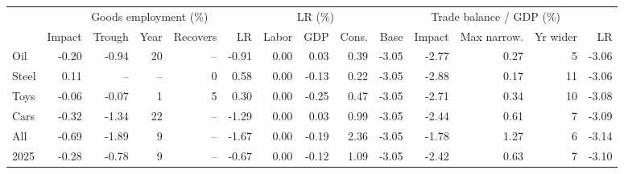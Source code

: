 \begin{tabular}{lrrrrrrrrrrrrr}
\toprule
 & \multicolumn{5}{c}{Goods employment (\%)} & \multicolumn{3}{c}{LR (\%)} & \multicolumn{5}{c}{Trade balance / GDP (\%)} \\
\cmidrule(lr){2-6}\cmidrule(lr){7-9}\cmidrule(lr){10-14}
 & Impact & Trough & Year & Recovers & LR & Labor & GDP & Cons. & Base & Impact & Max narrow. & Yr wider & LR \\
\midrule
Oil & -0.20 & -0.94 & 20 & -- & -0.91 & 0.00 & 0.03 & 0.39 & -3.05 & -2.77 & 0.27 & 5 & -3.06 \\
Steel & 0.11 & -- & -- & 0 & 0.58 & 0.00 & -0.13 & 0.22 & -3.05 & -2.88 & 0.17 & 11 & -3.06 \\
Toys & -0.06 & -0.07 & 1 & 5 & 0.30 & 0.00 & -0.25 & 0.47 & -3.05 & -2.71 & 0.34 & 10 & -3.08 \\
Cars & -0.32 & -1.34 & 22 & -- & -1.29 & 0.00 & 0.03 & 0.99 & -3.05 & -2.44 & 0.61 & 7 & -3.09 \\
All & -0.69 & -1.89 & 9 & -- & -1.67 & 0.00 & -0.19 & 2.36 & -3.05 & -1.78 & 1.27 & 6 & -3.14 \\
2025 & -0.28 & -0.78 & 9 & -- & -0.67 & 0.00 & -0.12 & 1.09 & -3.05 & -2.42 & 0.63 & 7 & -3.10 \\
\bottomrule
\end{tabular}
